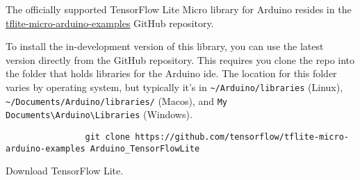 \begin{frame}[fragile]
    \par The officially supported TensorFlow Lite Micro library for Arduino\textregistered{} resides in the \href{https://github.com/tensorflow/tflite-micro-arduino-examples}{tflite-micro-arduino-examples} GitHub repository.
    \par To install the in-development version of this library, you can use the latest version directly from the GitHub repository.
    This requires you clone the repo into the folder that holds libraries for the Arduino\textregistered{} \acs{ide}.
    The location for this folder varies by operating system, but typically it's in \texttt{\textasciitilde{}/Arduino/libraries} (Linux), \texttt{\textasciitilde{}/Documents/Arduino/libraries/} (Mac\acs{os}), and \texttt{My Documents\textbackslash{}Arduino\textbackslash{}Libraries} (Windows).
    \begin{listing}[H]
        \begin{mdframed}
            \begin{verbatim}
                git clone https://github.com/tensorflow/tflite-micro-arduino-examples Arduino_TensorFlowLite
            \end{verbatim}
        \end{mdframed}
        \caption{Download TensorFlow Lite.}
        \label{lst:tflite:installation}
    \end{listing}
\end{frame}
